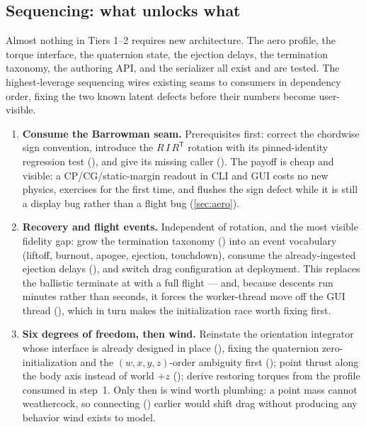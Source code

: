 \subsection{Sequencing: what unlocks what}\label{sec:roadmap-sequencing}

\begin{designrule}
Almost nothing in Tiers 1--2 requires new architecture. The aero profile, the torque interface,
the quaternion state, the ejection delays, the termination taxonomy, the authoring API, and the
serializer all exist and are tested. The highest-leverage sequencing wires existing seams to
consumers in dependency order, fixing the two known latent defects before their numbers become
user-visible.
\end{designrule}

\begin{enumerate}

  \item \textbf{Consume the Barrowman seam.} Prerequisites first: correct the 
  chordwise sign convention, introduce the $R\,I\,R^{\mathsf{T}}$ rotation with its
  pinned-identity regression test (), and give
   its missing caller ().
  The payoff is cheap and visible: a CP/CG/static-margin readout in CLI and GUI costs no new
  physics, exercises  for the first time, and flushes the sign defect while
  it is still a display bug rather than a flight bug (\cref{sec:aero}).

  \item \textbf{Recovery and flight events.} Independent of rotation, and the most visible
  fidelity gap: grow the termination taxonomy () into an event
  vocabulary (liftoff, burnout, apogee, ejection, touchdown), consume the already-ingested
  ejection delays (), and switch drag configuration at deployment.
  This replaces the ballistic terminate at  with a full flight ---
  and, because descents run minutes rather than seconds, it forces the worker-thread move off the
  GUI thread (), which in turn makes the initialization race worth fixing
  first.

  \item \textbf{Six degrees of freedom, then wind.} Reinstate the orientation integrator whose
  interface is already designed in place (), fixing the quaternion
  zero-initialization and the $(w,x,y,z)$-order ambiguity first (); point
  thrust along the body axis instead of world $+z$ (); derive
  restoring torques from the profile consumed in step~1. Only then is wind worth plumbing: a point
  mass cannot weathercock, so connecting  () earlier
  would shift drag without producing any behavior wind exists to model.


\end{enumerate}

